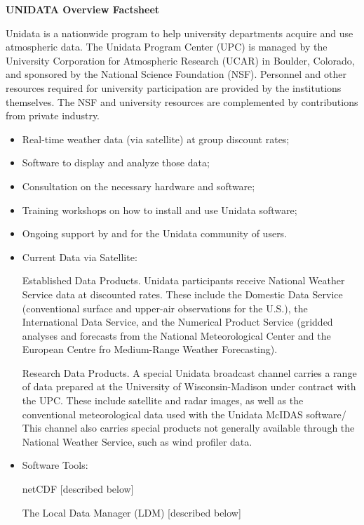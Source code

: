 \medskip
\large
{}
\normalsize
\medskip
\large
\begin{description}
\item{\bf *} {\bf UNIDATA Overview Factsheet}
\end{description}
\normalsize

	Unidata is a nationwide program to help university departments 
acquire and use atmospheric data.  The Unidata Program Center (UPC) is 
managed by the University Corporation for Atmospheric Research (UCAR) 
in Boulder, Colorado, and sponsored by the National Science Foundation 
(NSF).  Personnel and other resources required for university participation 
are provided by the institutions themselves.  The NSF and university 
resources are complemented by contributions from private industry.

\bigskip
{}
\begin{itemize}
	\item Real-time weather data (via satellite) at group discount rates;
	\item Software to display and analyze those data;
	\item Consultation on the necessary hardware and software;
	\item Training workshops on how to install and use Unidata software;
	\item Ongoing support by and for the Unidata community of users.
\end{itemize}

\begin{itemize}
\item Current Data via Satellite:

\noindent Established Data Products.  Unidata participants receive National 
Weather Service data at discounted rates.  These include the Domestic 
Data Service (conventional surface and upper-air observations for the 
U.S.), the International Data Service, and the Numerical Product Service 
(gridded analyses and forecasts from the National Meteorological Center 
and the European Centre fro Medium-Range Weather Forecasting).

\noindent Research Data Products.  A special Unidata broadcast channel carries 
a range of data prepared at the University of Wisconsin-Madison under
contract with the UPC.  These include satellite and radar images, as well as
the conventional meteorological data used with the Unidata McIDAS software/
This channel also carries special products not generally available through
the National Weather Service, such as wind profiler data.

\item Software Tools:

\noindent netCDF [described below]

\noindent The Local Data Manager (LDM) [described below]

\end{itemize}

